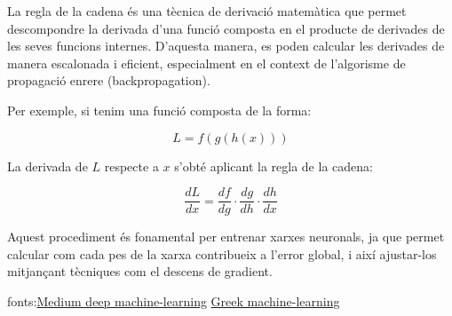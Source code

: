 La regla de la cadena és una tècnica de derivació matemàtica que permet descompondre la derivada d'una funció composta en el producte de derivades de les seves funcions internes. D’aquesta manera, es poden calcular les derivades de manera escalonada i eficient, especialment en el context de l’algorisme de propagació enrere (backpropagation).

Per exemple, si tenim una funció composta de la forma:

\[
L = f(g(h(x)))
\]

La derivada de \( L \) respecte a \( x \) s'obté aplicant la regla de la cadena:

\[
\frac{dL}{dx} = \frac{df}{dg} \cdot \frac{dg}{dh} \cdot \frac{dh}{dx}
\]

Aquest procediment és fonamental per entrenar xarxes neuronals, ja que permet calcular com cada pes de la xarxa contribueix a l'error global, i així ajustar-los mitjançant tècniques com el descens de gradient.

fonts:\href{https://medium.com/%40ppuneeth73/the-chain-rule-of-calculus-the-backbone-of-deep-learning-backpropagation-9d35affc05e7}{Medium deep machine-learning} \href{https://www.geeksforgeeks.org/machine-learning/chain-rule-derivative-in-machine-learning/}{Greek machine-learning}



